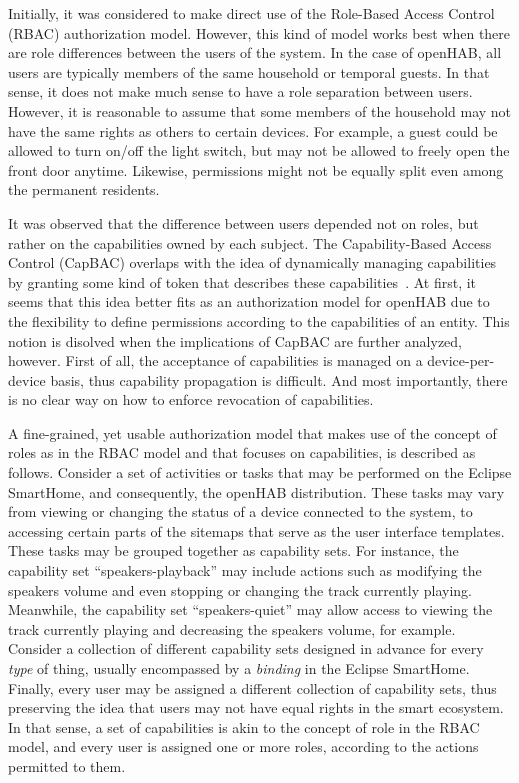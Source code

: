 \documentclass[12pt]{article}
\begin{document}
Initially, it was considered to make direct use of the Role-Based Access Control (RBAC) authorization model. However, this kind of model works best when there are role differences between the users of the system. In the case of openHAB, all users are typically members of the same household or temporal guests. In that sense, it does not make much sense to have a role separation between users. However, it is reasonable to assume that some members of the household may not have the same rights as others to certain devices. For example, a guest could be allowed to turn on/off the light switch, but may not be allowed to freely open the front door anytime. Likewise, permissions might not be equally split even among the permanent residents.

It was observed that the difference between users depended not on roles, but rather on the capabilities owned by each subject. The Capability-Based Access Control (CapBAC) overlaps with the idea of dynamically managing capabilities by granting some kind of token that describes these capabilities~\cite{access_01}. At first, it seems that this idea better fits as an authorization model for openHAB due to the flexibility to define permissions according to the capabilities of an entity. This notion is disolved when the implications of CapBAC are further analyzed, however. First of all, the acceptance of capabilities is managed on a device-per-device basis, thus capability propagation is difficult. And most importantly, there is no clear way on how to enforce revocation of capabilities.

A fine-grained, yet usable authorization model that makes use of the concept of roles as in the RBAC model and that focuses on capabilities, is described as follows. Consider a set of activities or tasks that may be performed on the Eclipse SmartHome, and consequently, the openHAB distribution. These tasks may vary from viewing or changing the status of a device connected to the system, to accessing certain parts of the sitemaps that serve as the user interface templates. These tasks may be grouped together as capability sets. For instance, the capability set ``speakers-playback'' may include actions such as modifying the speakers volume and even stopping or changing the track currently playing. Meanwhile, the capability set ``speakers-quiet'' may allow access to viewing the track currently playing and decreasing the speakers volume, for example. Consider a collection of different capability sets designed in advance for every \emph{type} of thing, usually encompassed by a \emph{binding} in the Eclipse SmartHome. Finally, every user may be assigned a different collection of capability sets, thus preserving the idea that users may not have equal rights in the smart ecosystem. In that sense, a set of capabilities is akin to the concept of role in the RBAC model, and every user is assigned one or more roles, according to the actions permitted to them.
\end{document}
